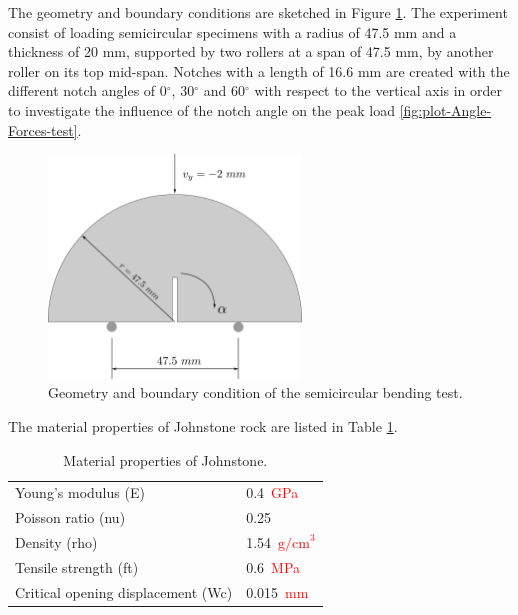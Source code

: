 \documentclass[preprint,12pt,a4paper]{elsarticle}
\begin{document}
The geometry and boundary conditions are sketched in Figure 
\ref{fig:geometry-Semicircular-bending-test}. The experiment consist of loading
semicircular specimens with a radius of 47.5 mm and a thickness of
20 mm, supported by two rollers at a span of 47.5 mm, by
another roller on its top mid-span. Notches with a length of 16.6 mm are
created with the different notch angles of 0$^{\circ}$, 30$^{\circ}$ and 60$^{\circ}$ with respect
to the vertical axis in order to investigate the influence of the
notch angle on the peak load \ref{fig:plot-Angle-Forces-test}.
\begin{figure}
  \centering
  \includegraphics[width=0.6\textwidth]{./Figure-Semicircular-bending-test}
  \caption{Geometry and boundary condition of the semicircular bending
    test.}
  \label{fig:geometry-Semicircular-bending-test}
\end{figure}
The material properties of Johnstone rock are listed in Table \ref{tab:Johnstone-properties}.
\begin{table}
  \centering
  \begin{tabular}[]{l l}
    \hline
    Young's modulus (\gls{E})   & 0.4\  \textcolor{red}{GPa}       \\
    Poisson ratio (\gls{nu})    & 0.25           \\
    Density (\gls{rho})         & 1.54\ \textcolor{red}{$\text{g/cm}^3$} \\
    Tensile strength (\gls{ft}) & 0.6\ \textcolor{red}{MPa}       \\
    Critical opening displacement (\gls{Wc}) & 0.015\ \textcolor{red}{mm} \\
    \hline
  \end{tabular}
  \caption[Mechanical properties of Johnstone. ]{Material properties of Johnstone.}
  \label{tab:Johnstone-properties}
\end{table}
\end{document}
